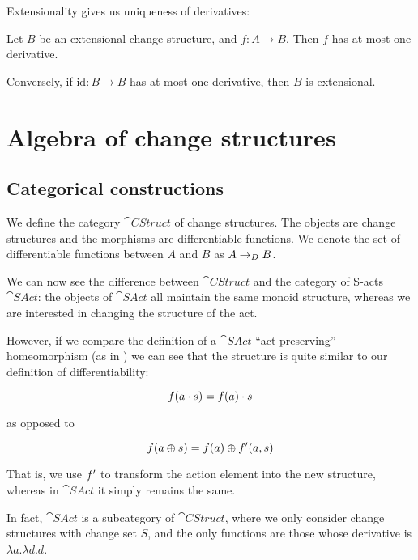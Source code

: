 Extensionality gives us uniqueness of derivatives:
\begin{prop}
  Let $B$ be an extensional change structure, and $f: A \rightarrow B$. Then $f$ has at
  most one derivative.

  Conversely, if $\textrm{id}: B \rightarrow B$ has at most one derivative, then
  $B$ is extensional.
\end{prop}

\section{Algebra of change structures}
\label{sec:algebra}

\subsection{Categorical constructions}

\begin{defn}
  We define the category $\cat{CStruct}$ of change structures. The objects are
  change structures and the morphisms are differentiable functions. We denote
  the set of differentiable functions between $A$ and $B$ as $A \rightarrow_{D} B$.
\end{defn}

We can now see the difference between $\cat{CStruct}$ and the category of
S-acts $\cat{SAct}$: the objects of $\cat{SAct}$ all maintain the same monoid
structure, whereas we are interested in changing the structure of the act.

However, if we compare the definition of a $\cat{SAct}$ ``act-preserving''
homeomorphism (as in \cite{kilp2000monoids}) we can see that the structure is quite similar to our definition
of differentiability:

$$f(a \cdot s) = f(a) \cdot s$$

as opposed to

$$f(a \oplus s) = f(a) \oplus f'(a, s)$$

That is, we use $f'$ to transform the action element into the new
structure, whereas in $\cat{SAct}$ it simply remains the same.

In fact, $\cat{SAct}$ is a subcategory of $\cat{CStruct}$, where we only
consider change structures with change set $S$, and the only functions are those
whose derivative is $\lambda a. \lambda d. d$.


